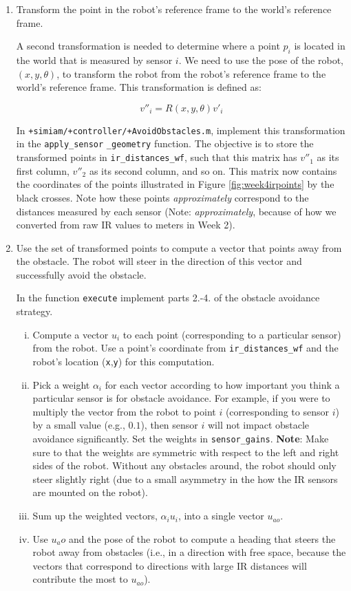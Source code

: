 \documentclass[10pt]{article}
\begin{document}
\begin{enumerate}
  \item Transform the point in the robot's reference frame to the world's reference frame.
  
  A second transformation is needed to determine where a point $p_i$ is located in the world that is measured by sensor $i$. We need to use the pose of the robot, $(x,y,\theta)$, to transform the robot from the robot's reference frame to the world's reference frame. This transformation is defined as:
  
  \begin{equation*}
    v''_i = R(x,y,\theta)v'_i
  \end{equation*}
  
  In \texttt{+simiam/+controller/+AvoidObstacles.m}, implement this transformation in the \texttt{apply\_sensor} \texttt{\_geometry} function. The objective is to store the transformed points in \texttt{ir\_distances\_wf}, such that this matrix has $v''_1$ as its first column, $v''_2$ as its second column, and so on. This matrix now contains the coordinates of the points illustrated in Figure \ref{fig:week4irpoints} by the black crosses. Note how these points \textit{approximately} correspond to the distances measured by each sensor (Note: \textit{approximately}, because of how we converted from raw IR values to meters in Week 2).
  
  \item Use the set of transformed points to compute a vector that points away from the obstacle. The robot will steer in the direction of this vector and successfully avoid the obstacle.
  
  In the function \texttt{execute} implement parts 2.-4. of the obstacle avoidance strategy.
  \begin{enumerate}[(i)]
    \item Compute a vector $u_i$ to each point (corresponding to a particular sensor) from the robot. Use a point's coordinate from \texttt{ir\_distances\_wf} and the robot's location (\texttt{x},\texttt{y}) for this computation.
    \item Pick a weight $\alpha_i$ for each vector according to how important you think a particular sensor is for obstacle avoidance. For example, if you were to multiply the vector from the robot to point $i$ (corresponding to sensor $i$) by a small value (e.g., $0.1$), then sensor $i$ will not impact obstacle avoidance significantly. Set the weights in \texttt{sensor\_gains}. \textbf{Note}: Make sure to that the weights are symmetric with respect to the left and right sides of the robot. Without any obstacles around, the robot should only steer slightly right (due to a small asymmetry in the how the IR sensors are mounted on the robot).
    \item Sum up the weighted vectors, $\alpha_iu_i$, into a single vector $u_{ao}$.
    \item Use $u_ao$ and the pose of the robot to compute a heading that steers the robot away from obstacles (i.e., in a direction with free space, because the vectors that correspond to directions with large IR distances will contribute the most to $u_{ao}$).    
  \end{enumerate} 
\end{enumerate}
\end{document}
